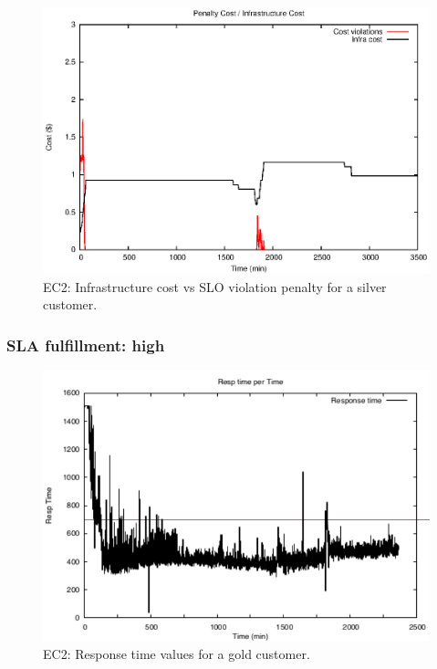 \begin{figure}
  \begin{center}
    \includegraphics[width=.85\linewidth]{images/exps2011/medium/ec2/penaltyVScost.eps}
  \end{center}
\vspace{-5mm}
  \caption{EC2: Infrastructure cost vs SLO violation penalty for a silver customer.}
  \label{mediumPenalty}
\end{figure}

\subsubsection{SLA fulfillment: high}

\begin{figure}
  \begin{center}
    \includegraphics[width=.85\linewidth]{images/exps2011/high/ec2/proxyDataPoints_output.pdf}
  \end{center}
\vspace{-5mm}
  \caption{EC2: Response time values for a gold customer.}
  \label{highResponseTime}
\end{figure}

